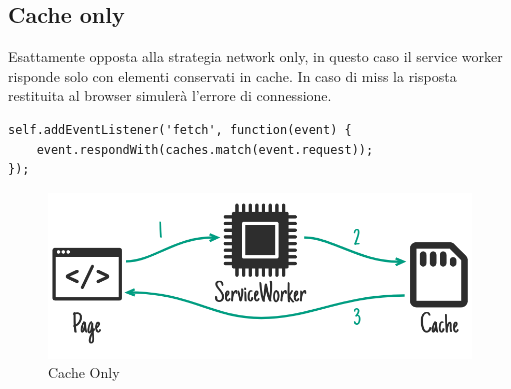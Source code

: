 \documentclass[11pt ,a4paper , twoside , openright ]{article}
\begin{document}
\subsection{Cache only}
Esattamente opposta alla strategia network only, in questo caso il service worker risponde solo con elementi conservati in cache. In caso di miss la risposta restituita al browser simulerà l’errore di connessione.
\begin{lstlisting}
self.addEventListener('fetch', function(event) {
	event.respondWith(caches.match(event.request));
});
\end{lstlisting}
\begin{figure}[h]
	\centering
	\includegraphics[width=1\linewidth]{Strategia4}
	\caption{Cache Only}
	\label{fig: Cache Only}
\end{figure}
\pagebreak
\end{document}
